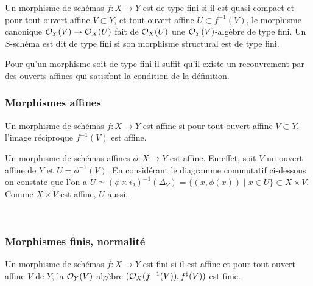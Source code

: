 \begin{defn}
Un morphisme de schémas $f:X\rightarrow Y$ est de type fini si il est quasi-compact et pour tout ouvert affine $V\subset Y$, et tout ouvert affine $U\subset f^{-1}(V)$, le morphisme canonique $\mathcal{O}_Y(V)\rightarrow \mathcal{O}_X(U)$ fait de $\mathcal{O}_X(U)$ une $\mathcal{O}_Y(V)$-algèbre de type fini. Un $S$-schéma est dit de type fini si son morphisme structural est de type fini.
\end{defn}

\begin{rem}
Pour qu'un morphisme soit de type fini il suffit qu'il existe un recouvrement par des ouverts affines qui satisfont la condition de la définition.
\end{rem}

\subsubsection{Morphismes affines}

\begin{defn}
Un morphisme de schémas $f:X\rightarrow Y$ est affine si pour tout ouvert affine $V\subset Y$, l'image réciproque $f^{-1}(V)$ est affine.
\end{defn}

\begin{ex}\label{exaff}
Un morphisme de schémas affines $\phi: X\rightarrow Y$ est affine. En effet, soit $V$ un ouvert affine de $Y$ et $U=\phi^{-1}(V)$. En considérant le diagramme commutatif ci-dessous on constate que l'on a $U \simeq (\phi\times i_2)^{-1}(\Delta_Y)=\lbrace (x,\phi(x))\mid x\in U \rbrace \subset X\times V$. Comme $X\times V$ est affine, $U$ aussi.
	\begin{center}
	\\
	\end{center}
\end{ex}


\subsubsection{Morphismes finis, normalité}

\begin{defn}
Un morphisme de schémas $f:X\rightarrow Y$ est fini si il est affine et pour tout ouvert affine $V$ de $Y$, la $\mathcal{O}_Y(V)$-algèbre $(\mathcal{O}_X(f^{-1}(V)), f^\sharp(V))$ est finie.
\end{defn}


